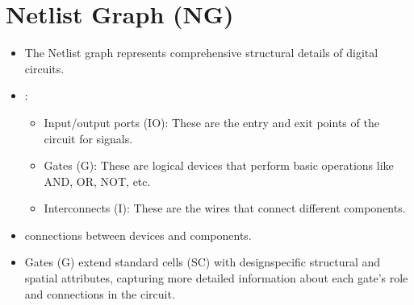 \documentclass[letterpaper,10pt,english]{sphinxmanual}
\begin{document}
\section{Netlist Graph (NG)}
\label{\detokenize{index:netlist-graph-ng}}\begin{itemize}
\item {} 
\sphinxAtStartPar
The Netlist graph represents comprehensive structural details of digital circuits.

\item {} 
\sphinxAtStartPar
{}:
\begin{itemize}
\item {} 
\sphinxAtStartPar
Input/output ports (IO): These are the entry and exit points of the circuit for signals.

\item {} 
\sphinxAtStartPar
Gates (G): These are logical devices that perform basic operations like AND, OR, NOT, etc.

\item {} 
\sphinxAtStartPar
Interconnects (I): These are the wires that connect different components.

\end{itemize}

\item {} 
\sphinxAtStartPar
{} connections between devices and components.

\item {} 
\sphinxAtStartPar
Gates (G) extend standard cells (SC) with design\sphinxhyphen{}specific structural and spatial attributes, capturing more detailed information about each gate’s role and connections in the circuit.

\end{itemize}

\end{document}
